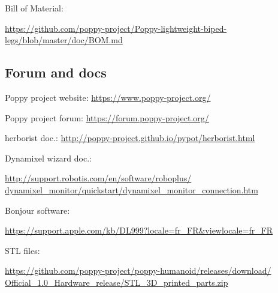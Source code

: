 \documentclass[includefoot]{article}
\begin{document}
Bill of Material:

\begin{flushright}
\href{https://github.com/poppy-project/Poppy-lightweight-biped-legs/blob/master/doc/BOM.md}{https://github.com/poppy-project/Poppy-lightweight-biped-legs/blob/master/doc/BOM.md}
\end{flushright}

\subsection{Forum and docs}

Poppy project website: \hfill \url{https://www.poppy-project.org/} 

Poppy project forum: \hfill \url{https://forum.poppy-project.org/} 

herborist doc.: \hfill
\href{http://poppy-project.github.io/pypot/herborist.html}{http://poppy-project.github.io/pypot/herborist.html}

Dynamixel wizard doc.:

\begin{flushright}
\href{http://support.robotis.com/en/software/roboplus/dynamixel_monitor/quickstart/dynamixel_monitor_connection.htm}{http://support.robotis.com/en/software/roboplus/ dynamixel\_monitor/quickstart/dynamixel\_monitor\_connection.htm}
\end{flushright}

Bonjour software:

\begin{flushright}
\href{https://support.apple.com/kb/DL999?locale=fr_FR&viewlocale=fr_FR}{https://support.apple.com/kb/DL999?locale=fr\_FR\&viewlocale=fr\_FR}
\end{flushright}

STL files:

\begin{flushright}
\href{https://github.com/poppy-project/poppy-humanoid/releases/download/Official_1.0_Hardware_release/STL_3D_printed_parts.zip}{https://github.com/poppy-project/poppy-humanoid/releases/download/ Official\_1.0\_Hardware\_release/STL\_3D\_printed\_parts.zip}
\end{flushright}
\end{document}
